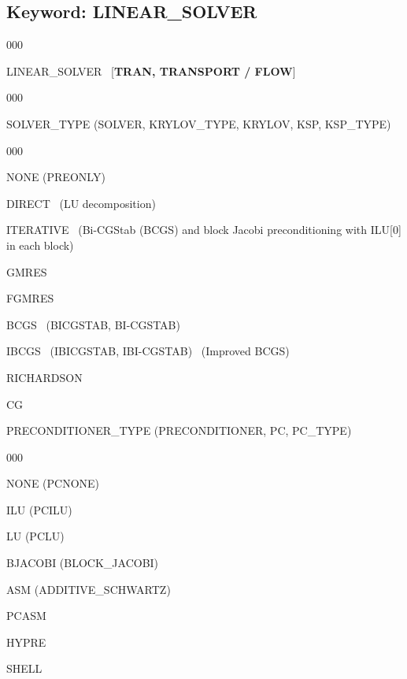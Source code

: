 \documentclass[12pt]{article}
\begin{document}
\hyperlink{target_key}{\return}


\newpage
\protect\hypertarget{target_linsolv}{}

\subsection{Keyword: LINEAR\_SOLVER}


\begin{deflist}{000}
\item[LINEAR\_SOLVER] \ [{\bf TRAN, TRANSPORT / FLOW}]

\begin{deflist}{000}
\item[SOLVER\_TYPE (SOLVER, KRYLOV\_TYPE, KRYLOV, KSP, KSP\_TYPE)] ~

\begin{deflist}{000}
\item[NONE (PREONLY)]
\item[DIRECT] \ (LU decomposition)
\item[ITERATIVE] \ (Bi-CGStab (BCGS) and block Jacobi preconditioning with ILU[0] in each block)
\item[GMRES]
\item[FGMRES]
\item[BCGS] \ (BICGSTAB, BI-CGSTAB) 
\item[IBCGS] \ (IBICGSTAB, IBI-CGSTAB) \ (Improved BCGS)
\item[RICHARDSON]
\item[CG]
\end{deflist}

\item[PRECONDITIONER\_TYPE (PRECONDITIONER, PC, PC\_TYPE)] ~

\begin{deflist}{000}
\item[NONE (PCNONE)]
\item[ILU (PCILU)] 
\item[LU (PCLU)]
\item[BJACOBI (BLOCK\_JACOBI)]
\item[ASM (ADDITIVE\_SCHWARTZ)]
\item[PCASM]
\item[HYPRE]
\item[SHELL]
\end{deflist}


\end{deflist}
\end{deflist}
\end{document}
